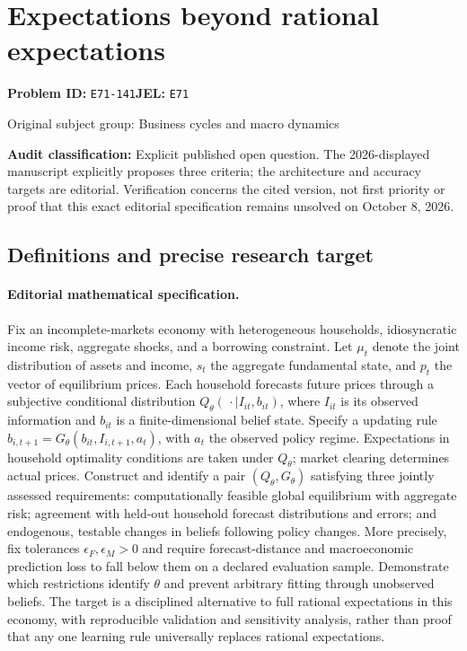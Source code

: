 \documentclass[11pt,a4paper]{article}
\begin{document}
\section*{Expectations beyond rational expectations}
\textbf{Problem ID:} \texttt{E71-141}\quad \textbf{JEL:} \texttt{E71}\par
\label{problem:OP-0233}
\label{audited:ECON-027}
{\sffamily\small\color{muted}Original subject group: Business cycles and macro dynamics\par}
\label{definitions:problem:30007514}
\textbf{Audit classification:} Explicit published open question. The 2026-displayed manuscript explicitly proposes three criteria; the architecture and accuracy targets are editorial. Verification concerns the cited version, not first priority or proof that this exact editorial specification remains unsolved on October 8, 2026.
\subsection*{Definitions and precise research target}
\paragraph{Editorial mathematical specification.} Fix an incomplete-markets economy with heterogeneous households, idiosyncratic income risk, aggregate shocks, and a borrowing constraint. Let \(\mu_t\) denote the joint distribution of assets and income, \(s_t\) the aggregate fundamental state, and \(p_t\) the vector of equilibrium prices. Each household forecasts future prices through a subjective conditional distribution \(Q_\theta(\,\cdot\mid I_{it},b_{it})\), where \(I_{it}\) is its observed information and \(b_{it}\) is a finite-dimensional belief state. Specify a updating rule \(b_{i,t+1}=G_\theta(b_{it},I_{i,t+1},a_t)\), with \(a_t\) the observed policy regime. Expectations in household optimality conditions are taken under \(Q_\theta\); market clearing determines actual prices.
Construct and identify a pair \((Q_\theta,G_\theta)\) satisfying three jointly assessed requirements: computationally feasible global equilibrium with aggregate risk; agreement with held-out household forecast distributions and errors; and endogenous, testable changes in beliefs following policy changes. More precisely, fix tolerances \(\epsilon_F,\epsilon_M>0\) and require forecast-distance and macroeconomic prediction loss to fall below them on a declared evaluation sample. Demonstrate which restrictions identify \(\theta\) and prevent arbitrary fitting through unobserved beliefs. The target is a disciplined alternative to full rational expectations in this economy, with reproducible validation and sensitivity analysis, rather than proof that any one learning rule universally replaces rational expectations.
\end{document}
